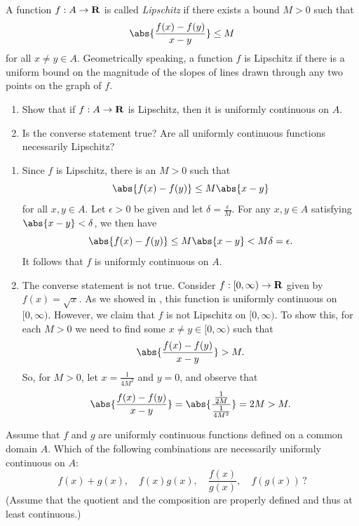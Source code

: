 \documentclass{lew98_solutions}
\begin{document}
\begin{exercise}
\label{ex:4.4.9}
    A function \( f : A \to \mathbf{R} \) is called \textit{Lipschitz} if there exists a bound \( M > 0 \) such that
    \[
        \abs{\frac{f(x) - f(y)}{x - y}} \leq M
    \]
    for all \( x \neq y \in A \). Geometrically speaking, a function \( f \) is Lipschitz if there is a uniform bound on the magnitude of the slopes of lines drawn through any two points on the graph of \( f \).
    \begin{enumerate}
        \item Show that if \( f : A \to \mathbf{R} \) is Lipschitz, then it is uniformly continuous on \( A \).

        \item Is the converse statement true? Are all uniformly continuous functions necessarily Lipschitz?
    \end{enumerate}
\end{exercise}

\begin{solution}
    \begin{enumerate}
        \item Since \( f \) is Lipschitz, there is an \( M > 0 \) such that
        \[
            \abs{f(x) - f(y)} \leq M \abs{x - y}
        \]
        for all \( x, y \in A \). Let \( \epsilon > 0 \) be given and let \( \delta = \tfrac{\epsilon}{M} \). For any \( x, y \in A \) satisfying \( \abs{x - y} < \delta \), we then have
        \[
            \abs{f(x) - f(y)} \leq M \abs{x - y} < M \delta = \epsilon.
        \]
        It follows that \( f \) is uniformly continuous on \( A \).

        \item The converse statement is not true. Consider \( f : [0, \infty) \to \mathbf{R} \) given by \( f(x) = \sqrt{x} \). As we showed in , this function is uniformly continuous on \( [0, \infty) \). However, we claim that \( f \) is not Lipschitz on \( [0, \infty) \). To show this, for each \( M > 0 \) we need to find some \( x \neq y \in [0, \infty) \) such that
        \[
            \abs{\frac{f(x) - f(y)}{x - y}} > M.
        \]
        So, for \( M > 0 \), let \( x = \tfrac{1}{4M^2} \) and \( y = 0 \), and observe that
        \[
            \abs{\frac{f(x) - f(y)}{x - y}} = \abs{\frac{\tfrac{1}{2M}}{\tfrac{1}{4M^2}}} = 2M > M.
        \]
    \end{enumerate}
\end{solution}

\begin{exercise}
\label{ex:4.4.10}
    Assume that \( f \) and \( g \) are uniformly continuous functions defined on a common domain \( A \). Which of the following combinations are necessarily uniformly continuous on \( A \):
    \[
        f(x) + g(x), \quad f(x)g(x), \quad \frac{f(x)}{g(x)}, \quad f(g(x)) \, ?
    \]
    (Assume that the quotient and the composition are properly defined and thus at least continuous.)
\end{exercise}
\end{document}
